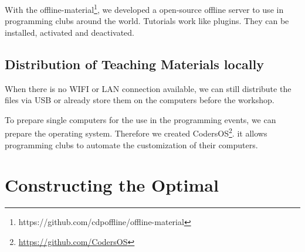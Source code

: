 With the offline-material\footnote{https://github.com/cdpoffline/offline-material}, we developed a open-source offline server to use in programming clubs around the world.
Tutorials work like plugins.
They can be installed, activated and deactivated.



\subsection{Distribution of Teaching Materials locally}

When there is no WIFI or LAN connection available, we can still distribute the files via USB or already store them on the computers before the workshop.

To prepare single computers for the use in the programming events, we can prepare the operating system.
Therefore we created CodersOS\footnote{\url{https://github.com/CodersOS}}.
it allows programming clubs to automate the customization of their computers.


\section{Constructing the Optimal}


